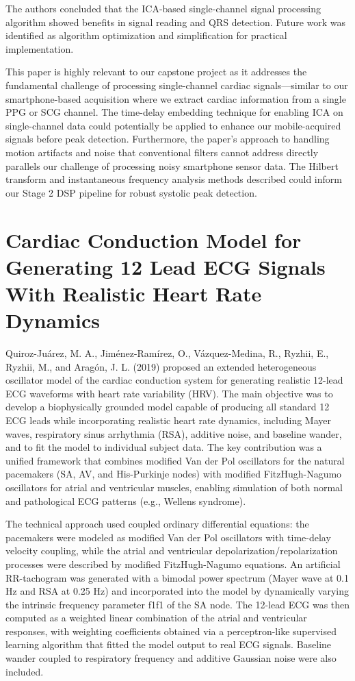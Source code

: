 The authors concluded that the ICA-based single-channel signal processing algorithm showed benefits in signal reading and QRS detection. Future work was identified as algorithm optimization and simplification for practical implementation.

This paper is highly relevant to our capstone project as it addresses the fundamental challenge of processing single-channel cardiac signals—similar to our smartphone-based acquisition where we extract cardiac information from a single PPG or SCG channel. The time-delay embedding technique for enabling ICA on single-channel data could potentially be applied to enhance our mobile-acquired signals before peak detection. Furthermore, the paper's approach to handling motion artifacts and noise that conventional filters cannot address directly parallels our challenge of processing noisy smartphone sensor data. The Hilbert transform and instantaneous frequency analysis methods described could inform our Stage 2 DSP pipeline for robust systolic peak detection.


\newpage
\section{Cardiac Conduction Model for Generating 12 Lead ECG Signals With Realistic Heart Rate Dynamics \cite{paper_2}}
Quiroz-Juárez, M. A., Jiménez-Ramírez, O., Vázquez-Medina, R., Ryzhii, E., Ryzhii, M., and Aragón, J. L. (2019) proposed an extended heterogeneous oscillator model of the cardiac conduction system for generating realistic 12-lead ECG waveforms with heart rate variability (HRV). The main objective was to develop a biophysically grounded model capable of producing all standard 12 ECG leads while incorporating realistic heart rate dynamics, including Mayer waves, respiratory sinus arrhythmia (RSA), additive noise, and baseline wander, and to fit the model to individual subject data. The key contribution was a unified framework that combines modified Van der Pol oscillators for the natural pacemakers (SA, AV, and His-Purkinje nodes) with modified FitzHugh-Nagumo oscillators for atrial and ventricular muscles, enabling simulation of both normal and pathological ECG patterns (e.g., Wellens syndrome).

The technical approach used coupled ordinary differential equations: the pacemakers were modeled as modified Van der Pol oscillators with time-delay velocity coupling, while the atrial and ventricular depolarization/repolarization processes were described by modified FitzHugh-Nagumo equations. An artificial RR-tachogram was generated with a bimodal power spectrum (Mayer wave at 0.1 Hz and RSA at 0.25 Hz) and incorporated into the model by dynamically varying the intrinsic frequency parameter f1f1​ of the SA node. The 12-lead ECG was then computed as a weighted linear combination of the atrial and ventricular responses, with weighting coefficients obtained via a perceptron-like supervised learning algorithm that fitted the model output to real ECG signals. Baseline wander coupled to respiratory frequency and additive Gaussian noise were also included.

